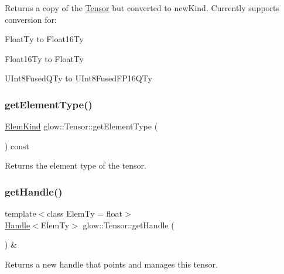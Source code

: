 \begin{DoxyReturn}{Returns}
a copy of the \hyperlink{classglow_1_1_tensor}{Tensor} but converted to {\ttfamily new\+Kind}. Currently supports conversion for\+:
\begin{DoxyItemize}
\item Float\+Ty to Float16\+Ty
\item Float16\+Ty to Float\+Ty
\item U\+Int8\+Fused\+Q\+Ty to U\+Int8\+Fused\+F\+P16\+Q\+Ty 
\end{DoxyItemize}
\end{DoxyReturn}
\mbox{\label{classglow_1_1_tensor_affaeb77d2037ea76e6deea21a13c39dc}} 
\subsubsection{\texorpdfstring{get\+Element\+Type()}{getElementType()}}
{\footnotesize\ttfamily \hyperlink{namespaceglow_ab92e14a94329daf4083db670e95fbcdf}{Elem\+Kind} glow\+::\+Tensor\+::get\+Element\+Type (\begin{DoxyParamCaption}{ }\end{DoxyParamCaption}) const\hspace{0.3cm}{\ttfamily [inline]}}

\begin{DoxyReturn}{Returns}
the element type of the tensor. 
\end{DoxyReturn}
\mbox{\label{classglow_1_1_tensor_a3145589191c1d1a4fd79f5c2f1215860}} 
\subsubsection{\texorpdfstring{get\+Handle()}{getHandle()}}
{\footnotesize\ttfamily template$<$class Elem\+Ty  = float$>$ \\
\hyperlink{classglow_1_1_handle}{Handle}$<$Elem\+Ty$>$ glow\+::\+Tensor\+::get\+Handle (\begin{DoxyParamCaption}{ }\end{DoxyParamCaption}) \&}

\begin{DoxyReturn}{Returns}
a new handle that points and manages this tensor. 
\end{DoxyReturn}
\mbox{\label{classglow_1_1_tensor_aa2559af82f20a58b5e9da6d136a0684e}} 
